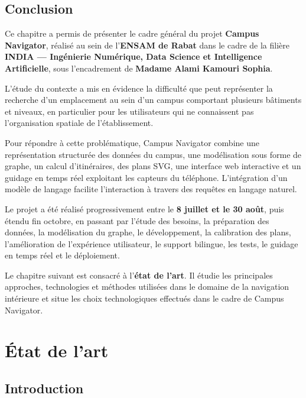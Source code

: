 \documentclass[12pt,a4paper]{report}
\begin{document}
\section{Conclusion}

Ce chapitre a permis de présenter le cadre général du projet \textbf{Campus Navigator}, réalisé
au sein de l'\textbf{ENSAM de Rabat} dans le cadre de la filière \textbf{INDIA — Ingénierie
Numérique, Data Science et Intelligence Artificielle}, sous l'encadrement de \textbf{Madame
Alami Kamouri Sophia}.

L'étude du contexte a mis en évidence la difficulté que peut représenter la recherche d'un
emplacement au sein d'un campus comportant plusieurs bâtiments et niveaux, en particulier pour
les utilisateurs qui ne connaissent pas l'organisation spatiale de l'établissement.

Pour répondre à cette problématique, Campus Navigator combine une représentation structurée des
données du campus, une modélisation sous forme de graphe, un calcul d'itinéraires, des plans SVG,
une interface web interactive et un guidage en temps réel exploitant les capteurs du téléphone.
L'intégration d'un modèle de langage facilite l'interaction à travers des requêtes en langage
naturel.

Le projet a été réalisé progressivement entre le \textbf{8 juillet et le 30 août}, puis étendu
fin octobre, en passant par l'étude des besoins, la préparation des données, la modélisation du
graphe, le développement, la calibration des plans, l'amélioration de l'expérience utilisateur,
le support bilingue, les tests, le guidage en temps réel et le déploiement.

Le chapitre suivant est consacré à l'\textbf{état de l'art}. Il étudie les principales approches,
technologies et méthodes utilisées dans le domaine de la navigation intérieure et situe les choix
technologiques effectués dans le cadre de Campus Navigator.

\chapter{État de l'art}

\section{Introduction}
\end{document}
